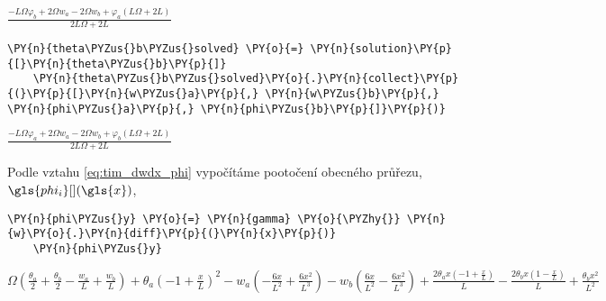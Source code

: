     
    $\displaystyle \frac{- L \Omega \varphi_{b} + 2 \Omega w_{a} - 2 \Omega w_{b} + \varphi_{a} \left(L \Omega + 2 L\right)}{2 L \Omega + 2 L}$
     
\begin{tcolorbox}[breakable, size=fbox, boxrule=1pt, pad at break*=1mm,colback=cellbackground, colframe=cellborder]
    \begin{Verbatim}[commandchars=\\\{\}]
    \PY{n}{theta\PYZus{}b\PYZus{}solved} \PY{o}{=} \PY{n}{solution}\PY{p}{[}\PY{n}{theta\PYZus{}b}\PY{p}{]}
    \PY{n}{theta\PYZus{}b\PYZus{}solved}\PY{o}{.}\PY{n}{collect}\PY{p}{(}\PY{p}{[}\PY{n}{w\PYZus{}a}\PY{p}{,} \PY{n}{w\PYZus{}b}\PY{p}{,} \PY{n}{phi\PYZus{}a}\PY{p}{,} \PY{n}{phi\PYZus{}b}\PY{p}{]}\PY{p}{)}
    \end{Verbatim}
\end{tcolorbox}
     
                
    
    $\displaystyle \frac{- L \Omega \varphi_{a} + 2 \Omega w_{a} - 2 \Omega w_{b} + \varphi_{b} \left(L \Omega + 2 L\right)}{2 L \Omega + 2 L}$
    
        
\vspace{0.3cm}
Podle vztahu \ref{eq:tim_dwdx_phi} vypočítáme pootočení obecného průřezu, $\gls{phi_i}[ ](\gls{x})$,
\begin{tcolorbox}[breakable, size=fbox, boxrule=1pt, pad at break*=1mm,colback=cellbackground, colframe=cellborder]
    \begin{Verbatim}[commandchars=\\\{\}]
    \PY{n}{phi\PYZus{}y} \PY{o}{=} \PY{n}{gamma} \PY{o}{\PYZhy{}} \PY{n}{w}\PY{o}{.}\PY{n}{diff}\PY{p}{(}\PY{n}{x}\PY{p}{)}
    \PY{n}{phi\PYZus{}y}
    \end{Verbatim}
    \end{tcolorbox}
     
                
    
    $\displaystyle \Omega \left(\frac{\theta_{a}}{2} + \frac{\theta_{b}}{2} - \frac{w_{a}}{L} + \frac{w_{b}}{L}\right) + \theta_{a} \left(-1 + \frac{x}{L}\right)^{2} - w_{a} \left(- \frac{6 x}{L^{2}} + \frac{6 x^{2}}{L^{3}}\right) - w_{b} \left(\frac{6 x}{L^{2}} - \frac{6 x^{2}}{L^{3}}\right) + \frac{2 \theta_{a} x \left(-1 + \frac{x}{L}\right)}{L} - \frac{2 \theta_{b} x \left(1 - \frac{x}{L}\right)}{L} + \frac{\theta_{b} x^{2}}{L^{2}}$
    
